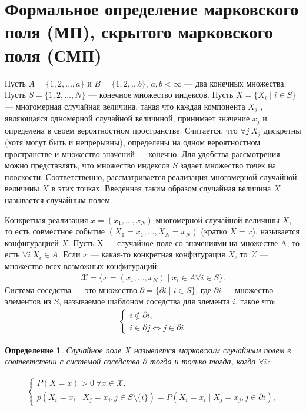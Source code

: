 \documentclass[12pt]{article}
\newtheorem{dfn}{Определение}
\begin{document}
\section{Формальное определение марковского поля (МП), скрытого марковского поля (СМП)}
Пусть $A = \{ 1, 2, \ldots, a\}$ и $B = \{1, 2,\ldots b\}$, $a, b < \infty$ --- два конечных
множества. Пусть $S = \{1, 2,  \ldots,  N\}$ --- конечное множество индексов.
Пусть $X = \{X_i \mid i \in S\}$ — многомерная случайная величина, такая что каждая компонента $X_j$ , являющаяся одномерной случайной величиной, принимает значение $x_j$ и определена в своем вероятностном пространстве. Считается, что $\forall j \ X_j$ дискретны (хотя могут быть и непрерывны), определены на одном
вероятностном пространстве и множество значений — конечно.
Для удобства рассмотрения можно представлять, что множество
индексов $S$ задает множество точек на плоскости. Соответственно, рассматривается реализация многомерной случайной величины $X$ в этих точках. Введенная таким образом случайная величина $X$ называется случайным полем.

Конкретная реализация $x = (x_1, \ldots, x_N)$ многомерной случайной величины $X$, то есть совместное событие $(X_1 = x_1, \ldots, X_N = x_N)$ (кратко $X = x$), называется конфигурацией $X$. Пусть X --- случайное поле со значениями на множестве A, то есть $\forall i  \ X_i \in A$. Если $x$ --- какая-то конкретная конфигурация $X$, то $\mathcal{X}$ ---
множество всех возможных конфигураций:
\begin{gather*}
\mathcal{X} = \{ x = (x_1, \ldots, x_N) \mid x_i \in A \forall i \in S\}.
\end{gather*}
Система соседства --- это множество $\partial = \{\partial i\mid i \in S \}$, где $\partial i$ --- множество элементов из $S $, называемое шаблоном соседства для элемента $i$, такое что:
\begin{gather*}
\begin{cases}
i \not \in \partial i, \\
i \in \partial j \Leftrightarrow j \in \partial i
\end{cases}
\end{gather*}

\begin{dfn}
Случайное поле $X$ называется марковским случайным полем в соответствии с системой соседства $\partial$ тогда
и только тогда, когда $\forall i$:

\begin{gather*}
\begin{cases}
P(X = x) > 0 \ \forall x \in \mathcal{X}, \\
p(X_i = x_i \mid X_j = x_j, j \in S \setminus \{i\}) = P(X_i = x_i \mid X_j = x_j, j \in \partial i),
\end{cases}
\end{gather*}
\end{dfn}
\end{document}
